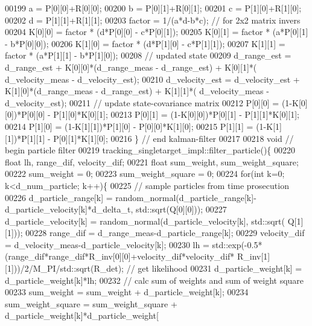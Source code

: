 \begin{DoxyCode}
00199         a = P[0][0]+R[0][0];
00200         b = P[0][1]+R[0][1];
00201         c = P[1][0]+R[1][0];
00202         d = P[1][1]+R[1][1];
00203         factor = 1/(a*d-b*c); \textcolor{comment}{// for 2x2 matrix invers}
00204         K[0][0] = factor * (d*P[0][0] - c*P[0][1]);
00205         K[0][1] = factor * (a*P[0][1] - b*P[0][0]);
00206         K[1][0] = factor * (d*P[1][0] - c*P[1][1]);
00207         K[1][1] = factor * (a*P[1][1] - b*P[1][0]);
00208         \textcolor{comment}{// updated state}
00209         d_range_est = d\_range\_est + K[0][0]*(d_range_meas - d_range_est) + K[0][1]*(
      d_velocity_meas - d\_velocity\_est);
00210         d\_velocity\_est = d\_velocity\_est + K[1][0]*(d_range_meas - d_range_est) + K[1][1]*(
      d_velocity_meas - d\_velocity\_est);
00211         \textcolor{comment}{// update state-covariance matrix}
00212         P[0][0] = (1-K[0][0])*P[0][0] - P[1][0]*K[0][1];
00213         P[0][1] = (1-K[0][0])*P[0][1] - P[1][1]*K[0][1];
00214         P[1][0] = (1-K[1][1])*P[1][0] - P[0][0]*K[1][0];
00215         P[1][1] = (1-K[1][1])*P[1][1] - P[0][1]*K[1][0];
00216     \} \textcolor{comment}{// end kalman-filter}
00217     
00218     \textcolor{keywordtype}{void} \textcolor{comment}{// begin particle filter}
00219     tracking_singletarget_impl::filter_particle()\{
00220         \textcolor{keywordtype}{float} lh, range\_dif, velocity\_dif;
00221         \textcolor{keywordtype}{float} sum\_weight, sum\_weight\_square;
00222         sum\_weight = 0;
00223         sum\_weight\_square = 0;
00224         \textcolor{keywordflow}{for}(\textcolor{keywordtype}{int} k=0; k<d_num_particle; k++)\{
00225             \textcolor{comment}{// sample particles from time prosecution}
00226             d_particle_range[k] = random_normal(d_particle_range[k]-
      d_particle_velocity[k]*d_delta_t, std::sqrt(Q[0][0]));
00227             d_particle_velocity[k] = random_normal(d_particle_velocity[k], std::sqrt(
      Q[1][1]));
00228             range\_dif = d_range_meas-d_particle_range[k];
00229             velocity\_dif = d_velocity_meas-d_particle_velocity[k];
00230             lh = std::exp(-0.5*(range\_dif*range\_dif*R_inv[0][0]+velocity\_dif*velocity\_dif*
      R_inv[1][1]))/2/M\_PI/std::sqrt(R_det); \textcolor{comment}{// get likelihood}
00231             d_particle_weight[k] = d_particle_weight[k]*lh;
00232             \textcolor{comment}{// calc sum of weights and sum of weight square}
00233             sum\_weight = sum\_weight + d_particle_weight[k];
00234             sum\_weight\_square = sum\_weight\_square + d\_particle\_weight[k]*d\_particle\_weight[

\end{DoxyCode}
